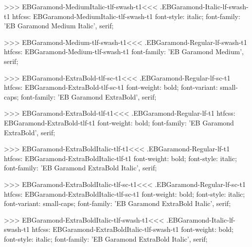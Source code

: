 {{{{{{{>>>
\<EBGaramond-MediumItalic-tlf-swash-t1\><<<
.EBGaramond-Italic-lf-swash-t1
htfcss:  EBGaramond-MediumItalic-tlf-swash-t1  font-style: italic; font-family: 'EB Garamond Medium Italic', serif;

>>>
\<EBGaramond-Medium-tlf-swash-t1\><<<
.EBGaramond-Regular-lf-swash-t1
htfcss:  EBGaramond-Medium-tlf-swash-t1  font-family: 'EB Garamond Medium', serif;

>>>
\<EBGaramond-ExtraBold-tlf-sc-t1\><<<
.EBGaramond-Regular-lf-sc-t1
htfcss:  EBGaramond-ExtraBold-tlf-sc-t1  font-weight: bold; font-variant: small-caps; font-family: 'EB Garamond ExtraBold', serif;

>>>
\<EBGaramond-ExtraBold-tlf-t1\><<<
.EBGaramond-Regular-lf-t1
htfcss:  EBGaramond-ExtraBold-tlf-t1  font-weight: bold; font-family: 'EB Garamond ExtraBold', serif;

>>>
\<EBGaramond-ExtraBoldItalic-tlf-t1\><<<
.EBGaramond-Regular-lf-t1
htfcss:  EBGaramond-ExtraBoldItalic-tlf-t1  font-weight: bold; font-style: italic; font-family: 'EB Garamond ExtraBold Italic', serif;

>>>
\<EBGaramond-ExtraBoldItalic-tlf-sc-t1\><<<
.EBGaramond-Regular-lf-sc-t1
htfcss:  EBGaramond-ExtraBoldItalic-tlf-sc-t1  font-weight: bold; font-style: italic; font-variant: small-caps; font-family: 'EB Garamond ExtraBold Italic', serif;

>>>
\<EBGaramond-ExtraBoldItalic-tlf-swash-t1\><<<
.EBGaramond-Italic-lf-swash-t1
htfcss:  EBGaramond-ExtraBoldItalic-tlf-swash-t1  font-weight: bold; font-style: italic; font-family: 'EB Garamond ExtraBold Italic', serif;

}}}}}}}
